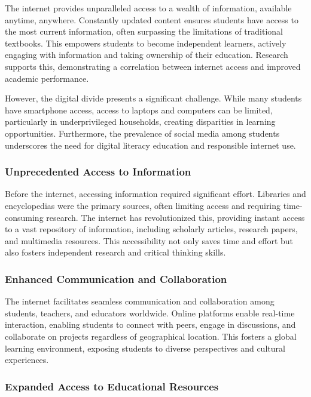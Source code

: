 \documentclass[a4paper,11pt]{article}
\begin{document}
The internet provides unparalleled access to a wealth of information, available anytime, anywhere.  Constantly updated content ensures students have access to the most current information, often surpassing the limitations of traditional textbooks. This empowers students to become independent learners, actively engaging with information and taking ownership of their education. Research supports this, demonstrating a correlation between internet access and improved academic performance.\cite{how-much-data-internet-each-day}

However, the digital divide presents a significant challenge. While many students have smartphone access, access to laptops and computers can be limited, particularly in underprivileged households, creating disparities in learning opportunities.  Furthermore, the prevalence of social media among students underscores the need for digital literacy education and responsible internet use.\cite{student-experience-using-internet}

\subsubsection{Unprecedented Access to Information} 

Before the internet, accessing information required significant effort. Libraries and encyclopedias were the primary sources, often limiting access and requiring time-consuming research. The internet has revolutionized this, providing instant access to a vast repository of information, including scholarly articles, research papers, and multimedia resources. This accessibility not only saves time and effort but also fosters independent research and critical thinking skills.\cite{internet-beneficial-students}

\subsubsection{Enhanced Communication and Collaboration}

The internet facilitates seamless communication and collaboration among students, teachers, and educators worldwide. Online platforms enable real-time interaction, enabling students to connect with peers, engage in discussions, and collaborate on projects regardless of geographical location. This fosters a global learning environment, exposing students to diverse perspectives and cultural experiences.\cite{internet-beneficial-students}

\subsubsection{Expanded Access to Educational Resources}
\end{document}
